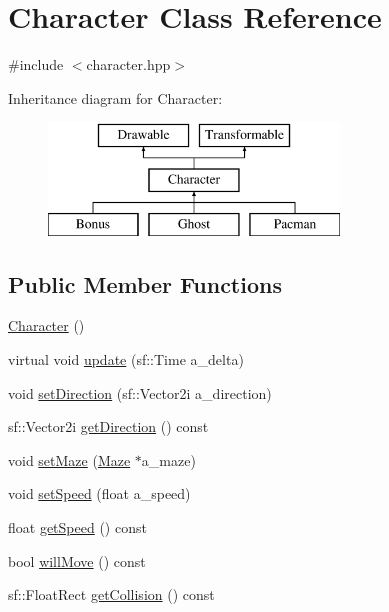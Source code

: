 \hypertarget{class_character}{}\section{Character Class Reference}
\label{class_character}


{\ttfamily \#include $<$character.\+hpp$>$}

Inheritance diagram for Character\+:\begin{figure}[H]
\begin{center}
\leavevmode
\includegraphics[height=3.000000cm]{class_character}
\end{center}
\end{figure}
\subsection*{Public Member Functions}
\begin{DoxyCompactItemize}
\item 
\hyperlink{class_character_adc27bdd255876169bad2ed0bae0cffb5}{Character} ()
\item 
virtual void \hyperlink{class_character_a89b72b507971ba8648909980d045ed06}{update} (sf\+::\+Time a\+\_\+delta)
\item 
void \hyperlink{class_character_a4af2fa47e778a3d8d6be65d728bed4e8}{set\+Direction} (sf\+::\+Vector2i a\+\_\+direction)
\item 
sf\+::\+Vector2i \hyperlink{class_character_ae8147e847ec305534ef4f2652f3541de}{get\+Direction} () const
\item 
void \hyperlink{class_character_a4a925db15b8f68d2c8d3201ce41f5863}{set\+Maze} (\hyperlink{class_maze}{Maze} $\ast$a\+\_\+maze)
\item 
void \hyperlink{class_character_a37068c523c733698c7f7ad587ccc66a0}{set\+Speed} (float a\+\_\+speed)
\item 
float \hyperlink{class_character_afb7791a8c122e8b88244f0a1a54506c0}{get\+Speed} () const
\item 
bool \hyperlink{class_character_a53d02c2b1c914990e51e0fb84913d151}{will\+Move} () const
\item 
sf\+::\+Float\+Rect \hyperlink{class_character_ab267ab6083ac0b311fc86754ceaed269}{get\+Collision} () const
\end{DoxyCompactItemize}
